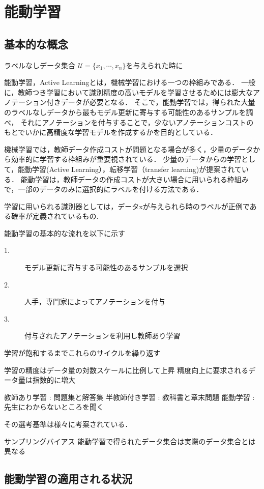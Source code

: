 \chapter{能動学習}
\section{基本的な概念}

ラベルなしデータ集合 $\mathcal{U} = \{x_1, \cdots, x_n\}$を与えられた時に

能動学習，Active Learning\cite{settles2010active}とは，機械学習における一つの枠組みである．
一般に，教師つき学習において識別精度の高いモデルを学習させるためには膨大なアノテーション付きデータが必要となる．
そこで，能動学習では，得られた大量のラベルなしデータから最もモデル更新に寄与する可能性のあるサンプルを調べ，
それにアノテーションを付与することで，少ないアノテーションコストのもとでいかに高精度な学習モデルを作成するかを目的としている．

機械学習では，教師データ作成コストが問題となる場合が多く，少量のデータから効率的に学習する枠組みが重要視されている．
少量のデータからの学習として，能動学習(Active Learning），転移学習（transfer learning)が提案されている．
能動学習は，教師データの作成コストが大きい場合に用いられる枠組みで，一部のデータのみに選択的にラベルを付ける方法である．


学習に用いられる識別器としては，データxが与えられら時のラベルが正例である確率が定義されているもの.

能動学習の基本的な流れを以下に示す
\begin{description}
    \item[1.] モデル更新に寄与する可能性のあるサンプルを選択
    \item[2.] 人手，専門家によってアノテーションを付与
    \item[3.] 付与されたアノテーションを利用し教師あり学習
\end{description}

学習が飽和するまでこれらのサイクルを繰り返す

学習の精度はデータ量の対数スケールに比例して上昇
精度向上に要求されるデータ量は指数的に増大

教師あり学習 : 問題集と解答集
半教師付き学習 : 教科書と章末問題
能動学習 : 先生にわからないところを聞く


その選考基準は様々に考案されている．

サンプリングバイアス
    能動学習で得られたデータ集合は実際のデータ集合とは異なる

\section{能動学習の適用される状況}

